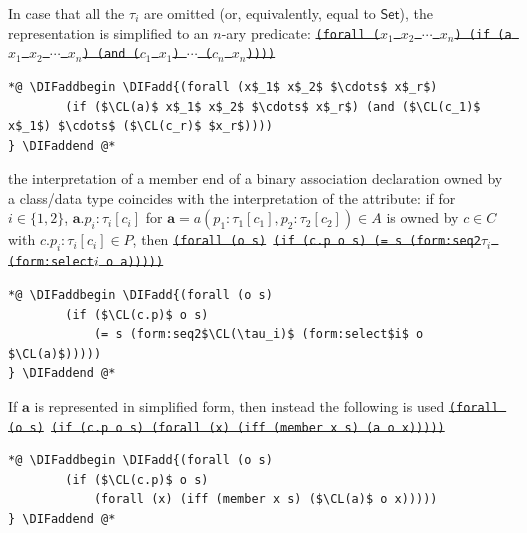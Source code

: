 \documentclass[10pt,fleqn,final]{scrreprt}
\newcommand*{\CL}{\ensuremath{\mathsf{CL}}\xspace}
\newenvironment{definitions}[0]{\medskip }{}
\newcommand{\white}[1]{{\color{white}{#1}}}
\newcommand{\qqquad}{\white{x}\qquad}
\providecommand{\DIFadd}[1]{{\protect\color{blue}\uwave{#1}}} %
\providecommand{\DIFdel}[1]{{\protect\color{red}\sout{#1}}}                      %
\providecommand{\DIFaddbegin}{} %
\providecommand{\DIFaddend}{} %
\providecommand{\DIFdelbegin}{} %
\providecommand{\DIFdelend}{} %
\begin{document}
\begin{definitions}
\begin{itemize}[topsep=0pt, label=--, leftmargin=*]
{In case that all the $\tau_i$ are omitted (or, equivalently, equal to 
$\mathsf{Set}$), the representation is simplified to an \DIFdelbegin \DIFdel{$n$}\DIFdelend \DIFaddbegin \DIFadd{$r$}\DIFaddend -ary predicate:
\DIFdelbegin %
\texttt{\DIFdel{(forall ($x_1$ $x_2$ $\cdots$  $x_n$) (if (a $x_1$ $x_2$ $\cdots$  $x_n$) (and ($c_1$ $x_1$) $\cdots$ ($c_n$ $x_n$))))}}
\DIFdelend %
 \begin{lstlisting}[language=clif, mathescape]
*@ \DIFaddbegin \DIFadd{(forall (x$_1$ x$_2$ $\cdots$ x$_r$)
        (if ($\CL(a)$ x$_1$ x$_2$ $\cdots$ x$_r$) (and ($\CL(c_1)$ x$_1$) $\cdots$ ($\CL(c_r)$ $x_r$))))
} \DIFaddend @*
\end{lstlisting}
   \item the interpretation of a member end of a binary association
declaration owned by a class/data type coincides with the interpretation
of the attribute: if for $i\in\{1,2\}$,
$\mathbf{a}.p_i : \tau_i[c_i]$
for $\mathbf{a} = a(p_1 : \tau_1[c_1], p_2 : \tau_2[c_2]) \in A$
is owned by $c \in C$ with $c.p_i : \tau_i[c_i] \in P$, then
\DIFdelbegin %
\texttt{\DIFdel{(forall (o s)}%
\DIFdel{(if (c.p o s) (= s (form:seq2$\tau_i$ (form:select$i$ o a)))))}}%
\DIFdelend %
 \begin{lstlisting}[language=clif, mathescape]
*@ \DIFaddbegin \DIFadd{(forall (o s)
        (if ($\CL(c.p)$ o s)
            (= s (form:seq2$\CL(\tau_i)$ (form:select$i$ o $\CL(a)$)))))
} \DIFaddend @*
\end{lstlisting}
 If $\mathbf{a}$ is represented in simplified form, then instead the
following is used
\DIFdelbegin %
\texttt{\DIFdel{(forall (o s)}%
\DIFdel{(if (c.p o s) (forall (x) (iff (member x s) (a o x)))))}}
\DIFdelend %
 \begin{lstlisting}[language=clif, mathescape]
*@ \DIFaddbegin \DIFadd{(forall (o s)
        (if ($\CL(c.p)$ o s)
            (forall (x) (iff (member x s) ($\CL(a)$ o x)))))
} \DIFaddend @*
\end{lstlisting}

}
\end{itemize}
\end{definitions}
\end{document}

